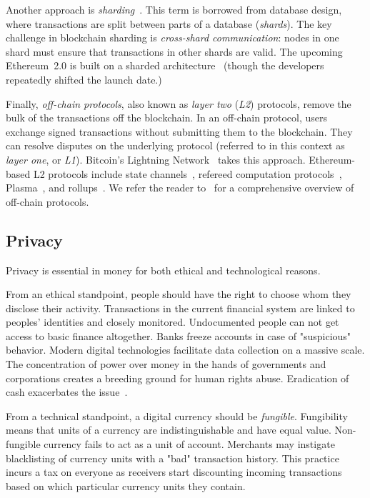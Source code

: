 Another approach is \textit{sharding}~\cite{Gencer2016, Luu2016a}.
This term is borrowed from database design, where transactions are split between parts of a database (\textit{shards}).
The key challenge in blockchain sharding is \textit{cross-shard communication}: nodes in one shard must ensure that transactions in other shards are valid.
The upcoming Ethereum~2.0 is built on a sharded architecture~\cite{ShardingFAQ} (though the developers repeatedly shifted the launch date.)

Finally, \textit{off-chain protocols}, also known as \textit{layer two} (\textit{L2}) protocols, remove the bulk of the transactions off the blockchain.
In an off-chain protocol, users exchange signed transactions without submitting them to the blockchain.
They can resolve disputes on the underlying protocol (referred to in this context as \textit{layer one}, or \textit{L1}).
Bitcoin's Lightning Network~\cite{Poon2016} takes this approach.
Ethereum-based L2 protocols include state channels~\cite{Dziembowski2017, RaidenWebsite, Miller2019, }, refereed computation protocols~\cite{Teutsch2017, Kalodner2018}, Plasma~\cite{Poon2017}, and rollups~\cite{Floersch2019, Gluchowski2019}.
We refer the reader to~\cite{Gudgeon2019} for a comprehensive overview of off-chain protocols.


\subsection{Privacy}

Privacy is essential in money for both ethical and technological reasons.

From an ethical standpoint, people should have the right to choose whom they disclose their activity.
Transactions in the current financial system are linked to peoples' identities and closely monitored.
Undocumented people can not get access to basic finance altogether.
Banks freeze accounts in case of "suspicious" behavior.
Modern digital technologies facilitate data collection on a massive scale.
The concentration of power over money in the hands of governments and corporations creates a breeding ground for human rights abuse.
Eradication of cash exacerbates the issue~\cite{Brito2019}.

From a technical standpoint, a digital currency should be \textit{fungible}.
Fungibility means that units of a currency are indistinguishable and have equal value.
Non-fungible currency fails to act as a unit of account.
Merchants may instigate blacklisting of currency units with a "bad" transaction history.
This practice incurs a tax on everyone as receivers start discounting incoming transactions based on which particular currency units they contain.

